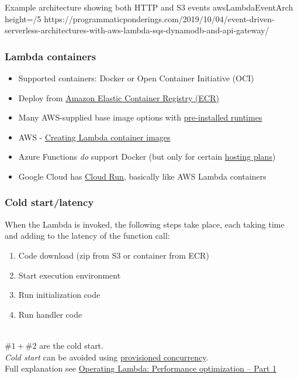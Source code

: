 \documentclass[11pt,aspectratio=169]{beamer}
\begin{document}
\nrcanGraphicFrame
  {Example architecture showing both HTTP and S3 events}
  {awsLambdaEventArch}
  {height=/5}
  {https://programmaticponderings.com/2019/10/04/event-driven-serverless-architectures-with-aws-lambda-sqs-dynamodb-and-api-gateway/}


\begin{nrcanFrame}
  \frametitle{Lambda containers}
  \begin{itemize}
  \item Supported containers: Docker or Open Container Initiative (OCI)
  \item Deploy from \href{https://aws.amazon.com/ecr/}{Amazon Elastic Container Registry (ECR)}
  \item Many AWS-supplied base image options with \href{https://docs.aws.amazon.com/lambda/latest/dg/lambda-runtimes.html}{pre-installed runtimes}
  \item
    AWS - \href{https://docs.aws.amazon.com/lambda/latest/dg/images-create.html}{Creating
      Lambda container images}
    \item Azure Functions \textit{do} support Docker (but only for certain
    \href{https://docs.microsoft.com/en-us/azure/azure-functions/functions-scale}{hosting
      plans})
    \item Google Cloud has \href{https://cloud.google.com/run}{Cloud
      Run}, basically like AWS Lambda containers
  \end{itemize}
\end{nrcanFrame}


\begin{nrcanFrame}
  \frametitle{Cold start/latency}
  When the Lambda is invoked, the following steps take place, each taking time and adding to the latency of the function call:
  \begin{enumerate}
  \item Code download (zip from S3 or container from ECR)
  \item Start execution environment
  \item Run initialization code
  \item Run handler code
  \end{enumerate}

  \ \\
  $\#1 + \#2$ are the \alert{cold start}.\\
  \textit{Cold start} can be avoided using \href{https://docs.aws.amazon.com/lambda/latest/dg/provisioned-concurrency.html}{provisioned concurrency}.\\
  Full explanation see \href{https://aws.amazon.com/blogs/compute/operating-lambda-performance-optimization-part-1/}{Operating Lambda: Performance optimization – Part 1}
\end{nrcanFrame}
\end{document}
